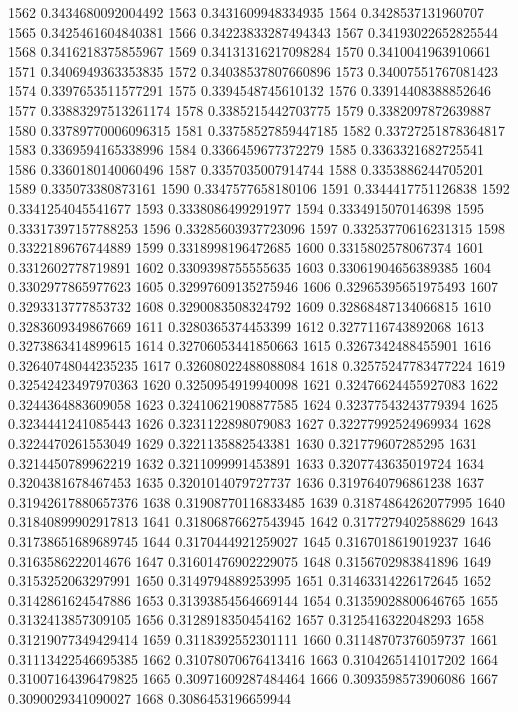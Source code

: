 1562 0.3434680092004492
1563 0.3431609948334935
1564 0.3428537131960707
1565 0.3425461604840381
1566 0.34223833287494343
1567 0.34193022652825544
1568 0.3416218375855967
1569 0.34131316217098284
1570 0.3410041963910661
1571 0.3406949363353835
1572 0.34038537807660896
1573 0.34007551767081423
1574 0.3397653511577291
1575 0.3394548745610132
1576 0.33914408388852646
1577 0.33883297513261174
1578 0.3385215442703775
1579 0.3382097872639887
1580 0.33789770006096315
1581 0.33758527859447185
1582 0.33727251878364817
1583 0.3369594165338996
1584 0.3366459677372279
1585 0.3363321682725541
1586 0.3360180140060496
1587 0.3357035007914744
1588 0.3353886244705201
1589 0.335073380873161
1590 0.3347577658180106
1591 0.3344417751126838
1592 0.3341254045541677
1593 0.3338086499291977
1594 0.3334915070146398
1595 0.33317397157788253
1596 0.33285603937723096
1597 0.33253770616231315
1598 0.3322189676744889
1599 0.3318998196472685
1600 0.3315802578067374
1601 0.3312602778719891
1602 0.3309398755555635
1603 0.33061904656389385
1604 0.3302977865977623
1605 0.32997609135275946
1606 0.32965395651975493
1607 0.3293313777853732
1608 0.3290083508324792
1609 0.32868487134066815
1610 0.3283609349867669
1611 0.3280365374453399
1612 0.3277116743892068
1613 0.3273863414899615
1614 0.32706053441850663
1615 0.3267342488455901
1616 0.32640748044235235
1617 0.32608022488088084
1618 0.32575247783477224
1619 0.32542423497970363
1620 0.3250954919940098
1621 0.32476624455927083
1622 0.3244364883609058
1623 0.32410621908877585
1624 0.32377543243779394
1625 0.3234441241085443
1626 0.3231122898079083
1627 0.32277992524969934
1628 0.3224470261553049
1629 0.3221135882543381
1630 0.321779607285295
1631 0.3214450789962219
1632 0.3211099991453891
1633 0.3207743635019724
1634 0.3204381678467453
1635 0.3201014079727737
1636 0.3197640796861238
1637 0.31942617880657376
1638 0.31908770116833485
1639 0.31874864262077995
1640 0.31840899902917813
1641 0.31806876627543945
1642 0.3177279402588629
1643 0.31738651689689745
1644 0.3170444921259027
1645 0.3167018619019237
1646 0.3163586222014676
1647 0.31601476902229075
1648 0.3156702983841896
1649 0.3153252063297991
1650 0.3149794889253995
1651 0.31463314226172645
1652 0.3142861624547886
1653 0.31393854564669144
1654 0.31359028800646765
1655 0.3132413857309105
1656 0.3128918350454162
1657 0.3125416322048293
1658 0.31219077349429414
1659 0.3118392552301111
1660 0.31148707376059737
1661 0.31113422546695385
1662 0.31078070676413416
1663 0.3104265141017202
1664 0.31007164396479825
1665 0.30971609287484464
1666 0.3093598573906086
1667 0.3090029341090027
1668 0.3086453196659944
